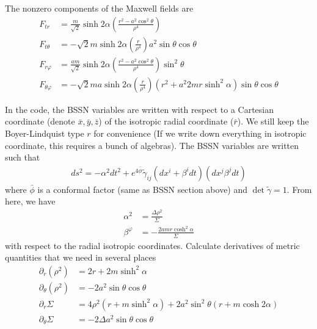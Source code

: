 \documentclass[prd]{revtex4}
\begin{document}
The nonzero components of the Maxwell fields are
\begin{align}
F_{tr} &= \frac{m}{\sqrt{2}} \sinh 2 \alpha \left( \frac{r^2 - a^2 \cos^2 \theta}{\rho^4} \right) \\
F_{t \theta} &= - \sqrt{2} m \sinh 2 \alpha \left(\frac{r}{\rho^4} \right) a^2 \sin \theta \cos \theta \\
F_{r \varphi} &= \frac{a m}{\sqrt{2}} \sinh 2 \alpha \left( \frac{r^2 - a^2 \cos^2 \theta}{\rho^4} \right) \sin^2 \theta \\
F_{\theta \varphi} &= - \sqrt{2} m a \sinh 2 \alpha \left(\frac{r}{\rho^4} \right) (r^2 + a^2 2 m r \sinh^2 \alpha) \sin \theta \cos \theta
\end{align}

In the code, the BSSN variables are written with respect to a Cartesian coordinate (denote $\bar{x}, \bar{y}, \bar{z}$) of the isotropic radial coordinate ($\bar{r}$). We still keep the Boyer-Lindquist type $r$ for convenience (If we write down everything in isotropic coordinate, this requires a bunch of algebras). The BSSN variables are written such that
\begin{align}
ds^2 = -\alpha^2 dt^2 +e^{4\bar{\phi}} \tilde{\gamma}_{ij} (dx^i + \beta^i dt)(dx^j \beta^j dt)
\end{align}
where $\bar{\phi}$ is a conformal factor (same as BSSN section above) and $\det \tilde{\gamma} = 1$. From here, we have
\begin{align}
\alpha^2 &= \frac{\Delta \rho^2}{\Sigma} \\
\beta^{\varphi} &= - \frac{2 a m r \cosh^2 \alpha}{\Sigma}
\end{align}
with respect to the radial isotropic coordinates. Calculate derivatives of metric quantities that we need in several places
\begin{align}
\partial_r (\rho^2) &= 2r + 2m\sinh^2 \alpha\\
\partial_\theta (\rho^2) &= - 2a^2 \sin \theta \cos \theta \\
\partial_r \Sigma &= 4 \rho^2 (r + m \sinh^2 \alpha) + 2a^2 \sin^2 \theta ( r + m \cosh 2 \alpha) \\
\partial_\theta \Sigma &= -2 \Delta a^2 \sin \theta \cos \theta
\end{align}
\end{document}
